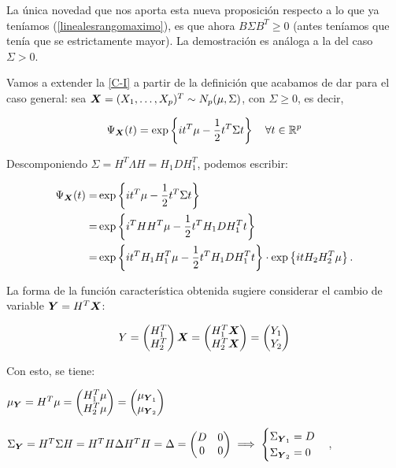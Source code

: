 \begin{nota}
  La única novedad que nos aporta esta nueva proposición respecto a lo que ya teníamos (\ref{linealesrangomaximo}), es que ahora $B\Sigma B^T \geq 0$ (antes teníamos que tenía que se estrictamente mayor).
La demostración es análoga a la del caso $\Sigma > 0$.
\end{nota}


Vamos a extender la \hyperref[posvar:car-i]{[C-I]} a partir de la definición que acabamos de dar para el caso general:
sea $\boldsymbol{X} = (X_1,\dots,X_p)^T\sim N_p(\mu,\Sigma)$, con $\Sigma \ge 0$, es decir,

\[
\Psi_{\boldsymbol{X}}(t) = \exp\left\{it^T\mu - \frac{1}{2}t^T\Sigma t\right\} \quad \forall t\in \mathbb R^p
\]

Descomponiendo $\Sigma = H^T\Lambda H = H_1 D H_1^T$, podemos escribir:

\[
\begin{split}
  \Psi_{\boldsymbol{X}}(t) = & \exp\left\{it^T\mu - \frac{1}{2}t^T\Sigma t\right\} \\
  = & \exp\left\{i^T HH^T \mu - \frac{1}{2}t^T H_1 D H_1^T t\right\} \\
  = & \exp\left\{it^T H_1 H_1^T\mu - \frac{1}{2}t^T H_1DH_1^Tt\right\} \cdot \exp\left\{itH_2H_2^T \mu\right\}
  .
\end{split}
\]

La forma de la función característica obtenida sugiere considerar el cambio de variable $\boldsymbol{Y} = H^T\boldsymbol{X}$:

\[
Y = \begin{pmatrix} H_1^T \\ H_2^T \end{pmatrix} \boldsymbol{X}=\begin{pmatrix} H_1^T \boldsymbol{X} \\ H_2^T\boldsymbol{X} \end{pmatrix} = \begin{pmatrix} Y_1 \\ Y_2 \end{pmatrix}
\]

Con esto, se tiene:
\begin{nlist}
\item $\mu_{\boldsymbol{Y}} = H^T \mu = \begin{pmatrix} H_1^T \mu \\ H_2^T\mu \end{pmatrix} = \begin{pmatrix} \mu_{\boldsymbol{Y}_1} \\ \mu_{\boldsymbol{Y}_2} \end{pmatrix}$
\item $\Sigma_{\boldsymbol{Y}} =  H^T \Sigma H = H^T H \Delta H^T H = \Delta = \begin{pmatrix} D & 0 \\ 0 & 0 \end{pmatrix} \implies \begin{cases} \Sigma_{\boldsymbol{Y}_1} = D \\ \Sigma_{\boldsymbol{Y}_2} = 0\end{cases}$,
\end{nlist}

